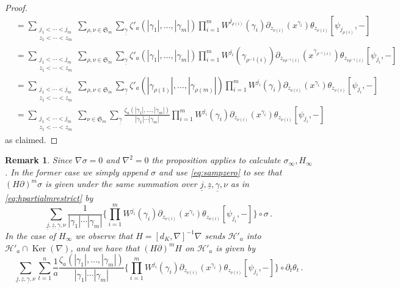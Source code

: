 \documentclass[english,letter paper,12pt,leqno]{article}
\theoremstyle{example}
\newtheorem{remark}[theorem]{Remark}
\numberwithin{equation}{section}
\def\Ker{\operatorname{Ker}}
\def\be{\begin{equation}}
\def\ee{\end{equation}}
\begin{document}
\begin{proof}
\begin{align*}
&= \sum_{\substack{j_1 < \cdots < j_m \\ z_1 < \cdots < z_m}} \sum_{\rho,\nu \in \mathfrak{S}_m} \sum_{\underline{\gamma}} \zeta'_{a}( |\gamma_1|, \ldots, |\gamma_m| ) \prod_{i=1}^m W^{j_{\rho(i)}}(\gamma_i) \partial_{z_{\nu(i)}}(x^{\gamma_i}) \theta_{z_{\nu(i)}} [ \psi_{j_{\rho(i)}}, - ]\\
&= \sum_{\substack{j_1 < \cdots < j_m \\ z_1 < \cdots < z_m}} \sum_{\rho,\nu \in \mathfrak{S}_m} \sum_{\underline{\gamma}} \zeta'_{a}( |\gamma_1|, \ldots, |\gamma_m| ) \prod_{i=1}^m W^{j_i}(\gamma_{\rho^{-1}(i)}) \partial_{z_{\nu\rho^{-1}(i)}}(x^{\gamma_{\rho^{-1}(i)}}) \theta_{z_{\nu\rho^{-1}(i)}} [ \psi_{j_i}, - ]\\
&= \sum_{\substack{j_1 < \cdots < j_m \\ z_1 < \cdots < z_m}} \sum_{\rho,\nu \in \mathfrak{S}_m} \sum_{\underline{\gamma}} \zeta'_{a}( |\gamma_{\rho(1)}|, \ldots, |\gamma_{\rho(m)}| ) \prod_{i=1}^m W^{j_i}(\gamma_i) \partial_{z_{\nu(i)}}(x^{\gamma_i}) \theta_{z_{\nu(i)}} [ \psi_{j_i}, - ]\\
&= \sum_{\substack{j_1 < \cdots < j_m \\ z_1 < \cdots < z_m}} \sum_{\nu \in \mathfrak{S}_m} \sum_{\underline{\gamma}} \frac{\zeta_{a}( |\gamma_1|,\ldots,|\gamma_m| )}{|\gamma_1| \cdots |\gamma_m|} \prod_{i=1}^m W^{j_i}(\gamma_i) \partial_{z_{\nu(i)}}(x^{\gamma_i}) \theta_{z_{\nu(i)}} [ \psi_{j_i}, - ]
\end{align*}
as claimed.
\end{proof}

\begin{remark} Since $\nabla \sigma = 0$ and $\nabla^2 = 0$ the proposition applies to calculate $\sigma_\infty, H_\infty$. In the former case we simply append $\sigma$ and use \eqref{eq:sampzero} to see that $(H \partial)^m \sigma$ is given under the same summation over $\underline{j},\underline{z},\underline{\gamma}, \nu$ as in \eqref{eq:hpartialmrestrict} by
\be
\sum_{\underline{j},\underline{z},\underline{\gamma},\nu} \frac{1}{|\gamma_1| \cdots |\gamma_m|} \Big\{ \prod_{i=1}^m W^{j_i}(\gamma_i) \partial_{z_{\nu(i)}}(x^{\gamma_i}) \theta_{z_{\nu(i)}} [ \psi_{j_i}, - ] \Big\} \circ \sigma\,.
\ee
In the case of $H_\infty$ we observe that $H = [d_K, \nabla]^{-1} \nabla$ sends $\mathscr{H}'_a$ into $\mathscr{H}'_a \cap \Ker(\nabla)$, and we have that $(H \partial)^m H$ on $\mathscr{H}'_a$ is given by
\be
\sum_{\underline{j},\underline{z},\underline{\gamma},\nu} \sum_{t = 1}^n \frac{1}{a} \frac{\zeta_{a}( |\gamma_1|,\ldots,|\gamma_m| )}{|\gamma_1| \cdots |\gamma_m|} \Big\{ \prod_{i=1}^m W^{j_i}(\gamma_i) \partial_{z_{\nu(i)}}(x^{\gamma_i}) \theta_{z_{\nu(i)}} [ \psi_{j_i}, - ] \Big\} \circ \partial_t \theta_t\,.
\ee
\end{remark}
\end{document}

